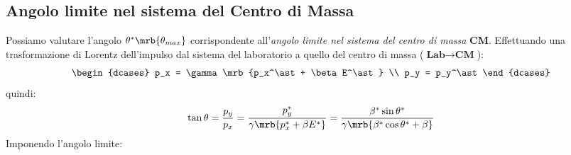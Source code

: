 \subsection{Angolo limite nel sistema del Centro di Massa}
Possiamo valutare l'angolo $\theta^\ast\mrb{\theta_{max}}$ corrispondente
all'\textit{angolo limite nel sistema del centro di massa} \textbf{CM}.
Effettuando una trasformazione di Lorentz dell'impulso dal sistema del
laboratorio a quello del centro di massa ($\textbf{Lab} \to \textbf{CM}$):
\begin{equation}
	\begin{dcases}
		p_x = \gamma \mrb{p_x^\ast + \beta E^\ast}
		\\
		p_y = p_y^\ast
	\end{dcases}
\end{equation}
quindi:
\begin{equation}
	\tan \theta = \frac{p_y}{p_x} = \frac{p_y^\ast}{\gamma \mrb{p_x^\ast + \beta E^\ast}}
	= \frac{\beta^\ast \sin \theta^\ast}{\gamma \mrb{\beta^\ast \cos \theta^\ast + \beta}}
\end{equation}
Imponendo l'angolo limite:
